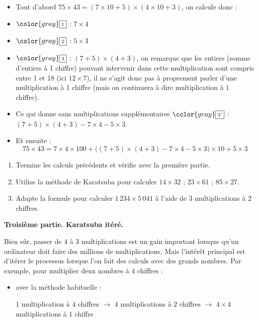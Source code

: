 \documentclass[class=report,crop=false, 12pt]{standalone}
\begin{document}
\begin{activite}
\begin{itemize}
  \item Tout d'abord $75 \times 43  = (7 \times 10 + 5) \times (4 \times 10 + 3)$, on calcule donc :
  \item $\color{gray}\fbox{\text{\scriptsize 1}}$ : $7 \times 4$
  \item $\color{gray}\fbox{\text{\scriptsize 2}}$ : $5 \times 3$
  \item $\color{gray}\fbox{\text{\scriptsize 3}}$ : $(7+5) \times (4+3)$, on remarque que les entiers (somme d'entiers à 1 chiffre) pouvant intervenir dans cette multiplication sont compris entre 1 et 18 (ici $12\times 7$), il ne s'agit donc pas à proprement parler d'une multiplication à 1 chiffre (mais on continuera à dire \og multiplication à $1$ chiffre\fg{}).
  \item Ce qui donne sans multiplications supplémentaires $\color{gray}\fbox{\text{\scriptsize 3'}}$ :
  $(7+5) \times (4+3) - 7 \times 4 - 5 \times 3$.
  \item Et ensuite :
  $$75 \times 43 = 7 \times 4 \times 100
  + \Big((7+5) \times (4+3) - 7 \times 4 - 5 \times 3 \Big) \times 10
  + 5 \times 3$$
\end{itemize}

  
\begin{enumerate} 
  \item Termine les calculs précédents et vérifie avec la première partie.  

  \item Utilise la méthode de Karatsuba pour calculer $14 \times 32$ ; $23 \times 61$ ; $85 \times 27$.

  \item Adapte la formule pour calculer $1\,234 \times 5\,041$ à l'aide de $3$ multiplications à $2$ chiffres.
\end{enumerate}  
 
\bigskip
\medskip

\textbf{Troisième partie. Karatsuba itéré.} 
 
Bien sûr, passer de $4$ à $3$ multiplications est un gain important lorsque qu'un ordinateur doit faire des millions de multiplications. Mais l'intérêt principal est d'itérer le processus lorsque l'on fait des calculs avec des grands nombres.
Par exemple, pour multiplier deux nombres à $4$ chiffres :
\begin{itemize}
  \item avec la méthode habituelle :  
  
  \centerline{\small
   $1$ multiplication à $4$ chiffres 
  $\longrightarrow$ $4$ multiplications à $2$ chiffres
  $\longrightarrow$ $4 \times 4$ multiplications à $1$ chiffre
  }
  

\end{itemize}
\end{activite}
\end{document}
